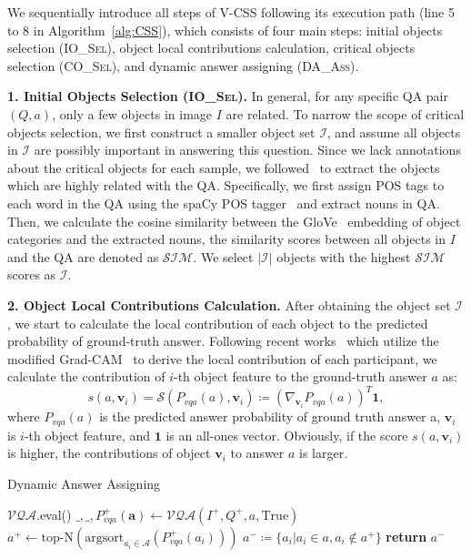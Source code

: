 \documentclass[10pt,twocolumn,letterpaper]{article}
\begin{document}
We sequentially introduce all steps of V-CSS following its execution path (line 5 to 8 in Algorithm~\ref{alg:CSS}), which consists of four main steps: initial objects selection (\textsc{IO\_Sel}), object local contributions calculation, critical objects selection (\textsc{CO\_Sel}), and dynamic answer assigning (\textsc{DA\_Ass}).

\textbf{1. Initial Objects Selection (\textsc{IO\_Sel}).} In general, for any specific QA pair $(Q, a)$, only a few objects in image $I$ are related. To narrow the scope of critical objects selection, we first construct a smaller object set $\mathcal{I}$, and assume all objects in $\mathcal{I}$ are possibly important in answering this question. Since we lack annotations about the critical objects for each sample, we followed~\cite{wu2019self} to extract the objects which are highly related with the QA. Specifically, we first assign POS tags to each word in the QA using the spaCy POS tagger~\cite{honnibal2017spacy} and extract nouns in QA. Then, we calculate the cosine similarity between the GloVe~\cite{pennington2014glove} embedding of object categories and the extracted nouns, the similarity scores between all objects in $I$ and the QA are denoted as $\mathcal{SIM}$. We select $|\mathcal{I}|$ objects with the highest $\mathcal{SIM}$ scores as $\mathcal{I}$. 

\textbf{2. Object Local Contributions Calculation.} After obtaining the object set $\mathcal{I}$, we start to calculate the local contribution of each object to the predicted probability of ground-truth answer. Following recent works~\cite{jain2019attention, selvaraju2019taking, wu2019self} which utilize the modified Grad-CAM~\cite{selvaraju2017grad} to derive the local contribution of each participant, we calculate the contribution of $i$-th object feature to the ground-truth answer $a$ as:
\begin{equation} \label{eq:object_gradcam}
s(a, \bm{v}_i) = \mathcal{S}(P_{vqa}(a), \bm{v}_i) \coloneqq (\nabla_{\bm{v}_i} P_{vqa}(a))^T\mathbf{1},
\end{equation}
where $P_{vqa}(a)$ is the predicted answer probability of ground truth answer a,  $\bm{v}_i$ is $i$-th object feature, and $\mathbf{1}$ is an all-ones vector. Obviously, if the score $s(a, \bm{v}_i)$ is higher, the contributions of object $\bm{v}_i$ to answer $a$ is larger.

\begin{algorithm}[tbp]
	\caption{Dynamic Answer Assigning}\label{alg:daass}
	\begin{algorithmic}[1]
		\State	$\mathcal{VQA}$.eval() 
		\State  $ \_, \_, P_{vqa}^+(\bm{a}) \leftarrow \mathcal{VQA}(I^+, Q^+, a, \text{True}) $
		\State $ a^+ \leftarrow \text{top-N}(\text{argsort}_{a_i \in \mathcal{A}}(P_{vqa}^+(a_i)))$
		\State $ a^- \coloneqq \{a_i | a_i \in a, a_i \notin a^+ \} $ 
		\State \textbf{return} $a^-$
		\EndFunction
	\end{algorithmic}
\end{algorithm}
\end{document}
